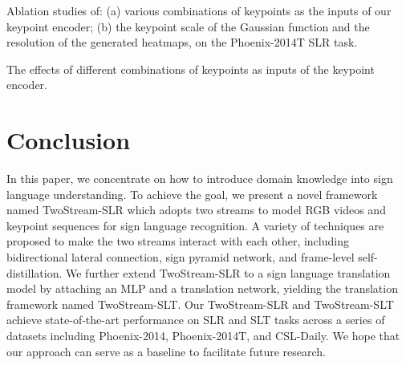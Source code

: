 \documentclass{article}
\begin{document}
\begin{table}[t]
    \caption{Ablation studies of: (a) various combinations of keypoints as the inputs of our keypoint encoder; (b) the keypoint scale  of the Gaussian function and the resolution of the generated heatmaps, on the Phoenix-2014T SLR task.}
    \centering
    \begin{subtable}[b]{0.68\textwidth}
\centering
    \caption{The effects of different combinations of keypoints as inputs of the keypoint encoder.}
\label{tab:keypoint_comb}
    \end{subtable}
    \hfill
    \begin{subtable}[b]{0.3\textwidth}
\centering
    \caption{Keypoint scale  and heatmap resolution.}
\label{tab:heatmap_input}
    \end{subtable}
\end{table} \section{Conclusion}
In this paper, we concentrate on how to introduce domain knowledge into sign language understanding. To achieve the goal, we present a novel framework named TwoStream-SLR which adopts two streams to model RGB videos and keypoint sequences for sign language recognition. A variety of techniques are proposed to make the two streams interact with each other, including bidirectional lateral connection, sign pyramid network, and frame-level self-distillation. We further extend TwoStream-SLR to a sign language translation model by attaching an MLP and a translation network, yielding the translation framework named TwoStream-SLT. Our TwoStream-SLR and TwoStream-SLT achieve state-of-the-art performance on SLR and SLT tasks across a series of datasets including Phoenix-2014, Phoenix-2014T, and CSL-Daily. We hope that our approach can serve as a baseline to facilitate future research.
\end{document}
